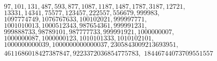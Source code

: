 $97, 101, 131, 487, 593, 877, 1087, 1187, 1487, 1787, 3187, 12721,$
$13331, 14341, 75577, 123457, 222557, 556679, 999983,$
$1097774749, 1076767633, 100102021, 999997771,$
$1001010013, 1000512343, 987654361,999991231,$
$999888733, 98789101, 987777733,999991921,1000000007,$
$1000000087, 1000000123,1010101333, 1010102101,$
$1000000000039,1000000000000037, 2305843009213693951,$
$4611686018427387847,9223372036854775783,$
$18446744073709551557$
